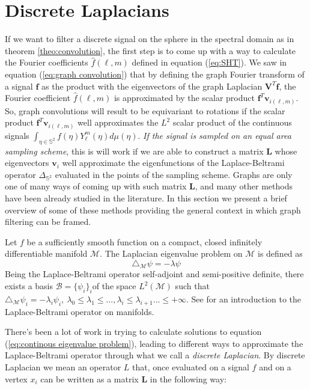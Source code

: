 
\section{Discrete Laplacians}\label{sec:Chapter3: other discrete laplacians}
If we want to filter a discrete signal on the sphere in the spectral domain as in theorem \ref{theo:convolution}, the first step is to come up with a way to calculate the Fourier coefficients $\hat f(\ell, m)$ defined in equation (\ref{eq:SHT}). We saw in equation (\ref{eq:graph convolution}) that by defining the graph Fourier transform of a signal $\mathbf f$ as the product with the eigenvectors of the graph Laplacian $\mathbf V^T \mathbf f$, the Fourier coefficient $\hat f(\ell, m)$ is approximated by the scalar product $\mathbf f^T \mathbf v_{i(\ell, m)}$. So, graph convolutions will result to be equivariant to rotations if the scalar product $\mathbf f^T \mathbf v_{i(\ell, m)}$ well approximates the $L^2$ scalar product of the continuous signals $\int_{\eta \in \mathbb S^2}f(\eta)Y_\ell^m(\eta)d\mu(\eta)$. \textit{If the signal is sampled on an equal area sampling scheme}, this is will work if we are able to construct a matrix $\mathbf L$ whose eigenvectors $\mathbf v_i$ well approximate the eigenfunctions of the Laplace-Beltrami operator $\Delta_{\mathbb S^2}$ evaluated in the points of the sampling scheme. Graphs are only one of many ways of coming up with such matrix $\mathbf L$, and many other methods have been already studied in the literature. In this section we present a brief overview of some of these methods providing the general context in which graph filtering can be framed.

Let $f$ be a sufficiently smooth function on a compact, closed infinitely differentiable manifold $\mathcal M$. The Laplacian eigenvalue problem on $\mathcal M$ is defined as 
\begin{equation}\label{eq:continous eigenvalue problem}
	\triangle_{\mathcal M}\psi = -\lambda \psi
\end{equation}
Being the Laplace-Beltrami operator self-adjoint and semi-positive definite, there exists a basis $\mathcal B=\{\psi_i\}_i$of the space $L^2(\mathcal M)$ such that $\triangle_\mathcal M \psi_i = -\lambda_i\psi_i,\ \lambda_0\leq\lambda_1\leq...,\lambda_i\leq\lambda_{i+1}...\leq+\infty$. See \cite{rosenberg_1997} for an introduction to the Laplace-Beltrami operator on manifolds.

There's been a lot of work in trying to calculate solutions to equation (\ref{eq:continous eigenvalue problem}), leading to different ways to approximate the Laplace-Beltrami operator through what we call a \textit{discrete Laplacian}. By discrete Laplacian we mean an operator $L$ that, once evaluated on a signal $f$ and on a vertex $x_i$ can be written as a matrix $\mathbf L$ in the following way:

